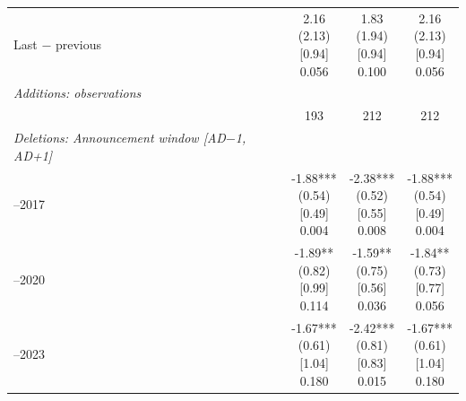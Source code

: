 \begin{threeparttable}
\begin{tabular}{@{}lccc}
\addlinespace[0.25ex]
\addlinespace[0.25ex]
Last $-$ previous & \makecell{2.16\\(2.13)\\{}[0.94]\\{0.056}} & \makecell{1.83\\(1.94)\\{}[0.94]\\{0.100}} & \makecell{2.16\\(2.13)\\{}[0.94]\\{0.056}} \\
\addlinespace[0.25ex]
\midrule
\emph{Additions: observations} \\
\addlinespace[0.25ex]
\addlinespace[1ex]
 & 193 & 212 & 212 \\
\addlinespace[0.25ex]
\midrule
\emph{Deletions: Announcement window [AD$-$1, AD+1]} \\
\addlinespace[0.25ex]
\addlinespace[1ex]
2013–2017 & \makecell{-1.88***\\(0.54)\\{}[0.49]\\{0.004}} & \makecell{-2.38***\\(0.52)\\{}[0.55]\\{0.008}} & \makecell{-1.88***\\(0.54)\\{}[0.49]\\{0.004}} \\
\addlinespace[0.25ex]
\addlinespace[0.25ex]
2018–2020 & \makecell{-1.89**\\(0.82)\\{}[0.99]\\{0.114}} & \makecell{-1.59**\\(0.75)\\{}[0.56]\\{0.036}} & \makecell{-1.84**\\(0.73)\\{}[0.77]\\{0.056}} \\
\addlinespace[0.25ex]
\addlinespace[0.25ex]
2021–2023 & \makecell{-1.67***\\(0.61)\\{}[1.04]\\{0.180}} & \makecell{-2.42***\\(0.81)\\{}[0.83]\\{0.015}} & \makecell{-1.67***\\(0.61)\\{}[1.04]\\{0.180}} \\

\end{tabular}
\end{threeparttable}
